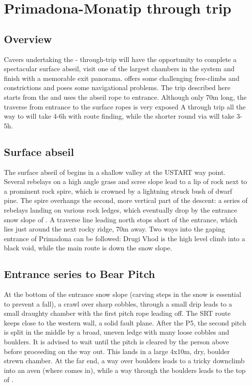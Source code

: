 \section{Primadona-Monatip through trip}

\subsection{Overview}
Cavers undertaking the - through-trip will have the opportunity to complete a spectacular surface abseil, visit one of the largest chambers in the system and finish with a memorable exit panorama.  offers some challenging free-climbs and constrictions and poses some navigational problems. The trip described here starts from the  and uses the abseil rope to  entrance. Although only 70m long, the traverse from  entrance to the surface ropes is very exposed A through trip all the way to  will take 4-6h with route finding, while the shorter round via  will take 3-5h. 

\subsection{Surface abseil}
The surface abseil of  begins in a shallow valley at the USTART way point. Several rebelays on a high angle grass and scree slope lead to a lip of rock next to a prominent rock spire, which is crowned by a lightning struck bush of dwarf pine. The spire overhangs the second, more vertical part of the descent: a series of rebelays landing on various rock ledges, which eventually drop by the entrance snow slope of . A traverse line leading north stops short of the  entrance, which lies just around the next rocky ridge, 70m away. Two ways into the gaping entrance of Primadona can be followed: Drugi Vhod is the high level climb into a black void, while the main route is down the snow slope.

\subsection{Entrance series to Bear Pitch}
At the bottom of the entrance snow slope (carving steps in the snow is essential to prevent a fall), a crawl over sharp cobbles, through a small drip leads to a small draughty chamber with the first pitch rope leading off. The SRT route keeps close to the western wall, a solid fault plane. After the P5, the second pitch is split in the middle by a broad, uneven ledge with many loose cobbles and boulders. It is advised to wait until the pitch is cleared by the person above before proceeding on the way out. This lands in a large 4x10m, dry, boulder strewn chamber. At the far end, a way over boulders leads to a tricky downclimb into an aven (where  comes in), while a way through the boulders leads to the top of .

